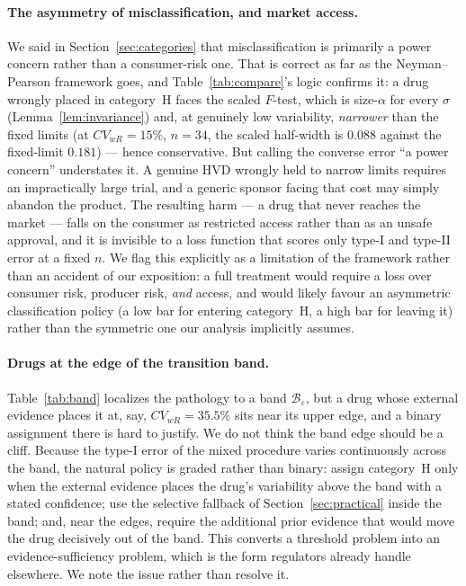 \documentclass[11pt]{article}
\theoremstyle{remark}
\begin{document}
\paragraph{The asymmetry of misclassification, and market access.} We said in Section~\ref{sec:categories} that misclassification is primarily a power concern rather than a consumer-risk one. That is correct as far as the Neyman--Pearson framework goes, and Table~\ref{tab:compare}'s logic confirms it: a drug wrongly placed in category~H faces the scaled $F$-test, which is size-$\alpha$ for every $\sigma$ (Lemma~\ref{lem:invariance}) and, at genuinely low variability, \emph{narrower} than the fixed limits (at $CV_{wR}=15\%$, $n=34$, the scaled half-width is $0.088$ against the fixed-limit $0.181$) --- hence conservative. But calling the converse error ``a power concern'' understates it. A genuine HVD wrongly held to narrow limits requires an impractically large trial, and a generic sponsor facing that cost may simply abandon the product. The resulting harm --- a drug that never reaches the market --- falls on the consumer as restricted access rather than as an unsafe approval, and it is invisible to a loss function that scores only type-I and type-II error at a fixed $n$. We flag this explicitly as a limitation of the framework rather than an accident of our exposition: a full treatment would require a loss over consumer risk, producer risk, \emph{and} access, and would likely favour an asymmetric classification policy (a low bar for entering category~H, a high bar for leaving it) rather than the symmetric one our analysis implicitly assumes.

\paragraph{Drugs at the edge of the transition band.} Table~\ref{tab:band} localizes the pathology to a band $\mathcal{B}_\varepsilon$, but a drug whose external evidence places it at, say, $CV_{wR}=35.5\%$ sits near its upper edge, and a binary assignment there is hard to justify. We do not think the band edge should be a cliff. Because the type-I error of the mixed procedure varies continuously across the band, the natural policy is graded rather than binary: assign category~H only when the external evidence places the drug's variability above the band with a stated confidence; use the selective fallback of Section~\ref{sec:practical} inside the band; and, near the edges, require the additional prior evidence that would move the drug decisively out of the band. This converts a threshold problem into an evidence-sufficiency problem, which is the form regulators already handle elsewhere. We note the issue rather than resolve it.
\end{document}

